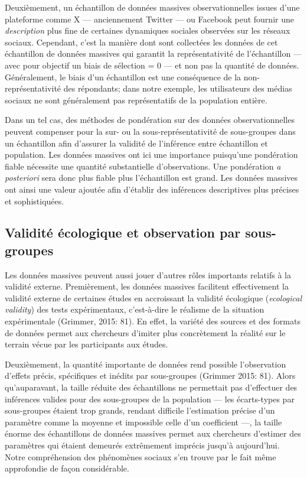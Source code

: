 \documentclass[
  letterpaper,
]{scrbook}
\begin{document}
Deuxièmement, un échantillon de données massives observationnelles
issues d'une plateforme comme X --- anciennement Twitter --- ou Facebook
peut fournir une \emph{description} plus fine de certaines dynamiques
sociales observées sur les réseaux sociaux. Cependant, c'est la manière
dont sont collectées les données de cet échantillon de données massives
qui garantit la représentativité de l'échantillon --- avec pour objectif
un biais de sélection = 0 --- et non pas la quantité de données.
Généralement, le biais d'un échantillon est une conséquence de la
non-représentativité des répondants; dans notre exemple, les
utilisateurs des médias sociaux ne sont généralement pas représentatifs
de la population entière.

Dans un tel cas, des méthodes de pondération sur des données
observationnelles peuvent compenser pour la sur- ou la
sous-représentativité de sous-groupes dans un échantillon afin d'assurer
la validité de l'inférence entre échantillon et population. Les données
massives ont ici une importance puisqu'une pondération fiable nécessite
une quantité substantielle d'observations. Une pondération \emph{a
posteriori} sera donc plus fiable plus l'échantillon est grand. Les
données massives ont ainsi une valeur ajoutée afin d'établir des
inférences descriptives plus précises et sophistiquées.

\hypertarget{validituxe9-uxe9cologique-et-observation-par-sous-groupes}{%
\subsection{Validité écologique et observation par
sous-groupes}\label{validituxe9-uxe9cologique-et-observation-par-sous-groupes}}

Les données massives peuvent aussi jouer d'autres rôles importants
relatifs à la validité externe. Premièrement, les données massives
facilitent effectivement la validité externe de certaines études en
accroissant la validité écologique (\emph{ecological validity}) des
tests expérimentaux, c'est-à-dire le réalisme de la situation
expérimentale (Grimmer, 2015: 81). En effet, la variété des sources et
des formats de données permet aux chercheurs d'imiter plus concrètement
la réalité sur le terrain vécue par les participants aux études.

Deuxièmement, la quantité importante de données rend possible
l'observation d'effets précis, spécifiques et inédits par sous-groupes
(Grimmer 2015: 81). Alors qu'auparavant, la taille réduite des
échantillons ne permettait pas d'effectuer des inférences valides pour
des sous-groupes de la population --- les écarts-types par sous-groupes
étaient trop grands, rendant difficile l'estimation précise d'un
paramètre comme la moyenne et impossible celle d'un coefficient ---, la
taille énorme des échantillons de données massives permet aux chercheurs
d'estimer des paramètres qui étaient demeurés extrêmement imprécis
jusqu'à aujourd'hui. Notre compréhension des phénomènes sociaux s'en
trouve par le fait même approfondie de façon considérable.
\end{document}
